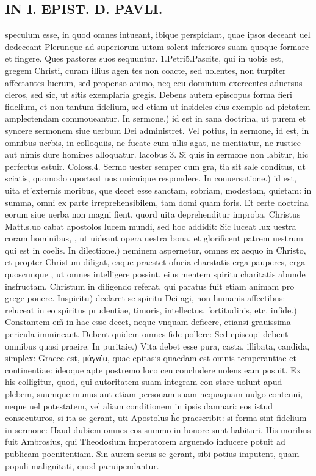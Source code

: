 \documentclass{article}
\begin{document}
\begin{pages}
\section*{IN I. EPIST. D. PAVLI. }
\marginpar{[ p.101 ]}\pstart speculum esse, in quod omnes intueant, ibique perspiciant, quae ipsos deceant uel dedeceant Plerunque ad superiorum uitam solent inferiores suam quoque formare et fingere. Ques pastores suos sequuntur. 1.Petri5.Pascite, qui in uobis est, gregem Christi, curam illius agen tes non coacte, sed uolentes, non turpiter affectantes lucrum, sed propenso animo, neq ceu dominium exercentes aduersus cleros, sed sic, ut sitis exemplaria gregis. Debens autem episcopus forma fieri fidelium, et non tantum fidelium, sed etiam ut insideles eius exemplo ad pietatem amplectendam commoueantur.  \pend\pstart In sermone.) id est in sana doctrina, ut purem et syncere sermonem siue uerbum Dei administret. Vel potius, in sermone, id est, in omnibus uerbis, in colloquiis, ne fucate cum ullis agat, ne mentiatur, ne rustice aut nimis dure homines alloquatur. lacobus 3. Si quis in sermone non labitur, hic perfectus estuir. Coloss.4. Sermo uester semper cum gra, tia sit sale conditus, ut sciatis, quomodo oporteat uos unicuique respondere.  \pend\pstart In conuersatione.) id est, uita et’externis moribus, que decet esse sanctam, sobriam, modestam, quietam: in summa, omni ex parte irreprehensibilem, tam domi quam foris. Et certe doctrina eorum siue uerba non magni fient, quord uita deprehenditur improba. Christus Matt.s.uo cabat apostolos lucem mundi, sed hoc addidit: Sic luceat lux uestra coram hominibus,  , ut uideant opera uestra bona, et glorificent patrem uestrum qui est in coelis.  \pend\pstart In dilectione.) neminem aspernetur, omnes ex aequo in Christo, et propter Christum diligat, eaque praestet ofneia charstatis erga pauperes, erga quoscunque , ut omnes intelligere possint, eius mentem spiritu charitatis abunde insfructam. Christum in diligendo referat, qui paratus fuit etiam animam pro grege ponere.  \pend\pstart Inspiritu) declaret se spiritu Dei agi, non humanis affectibus: reluceat in eo spiritus prudentiae, timoris, intellectus, fortitudinis, etc.  \pend\pstart infide.) Constantem em̃ in hac esse decet, neque vnquam deficere, etiansi grauissima pericula immineant. Debent quidem omnes fide pollere: Sed episcopi debent omnibus quasi praeire. In puritaie.) Vita debet esse pura, casta, illibata, candida, simplex: Graece est, μάγνέα, quae epitasis quaedam est omnis temperantiae et continentiae: ideoque apte postremo loco ceu concludere uolens eam posuit. Ex his colligitur, quod, qui autoritatem suam integram con stare uolunt apud plebem, suumque munus aut etiam personam suam nequaquam uulgo contenni, neque uel potestatem, vel aliam conditionem in ipsis damnari: eos istud consecuturos, si ita se gerant, uti Apostolus ĥe praescribit: si forma sint fidelium in sermone: Haud dubiem omnes eos summo in honore sunt habituri. His moribus fuit Ambrosius, qui Theodosium imperatorem arguendo inducere potuit ad publicam poenitentiam. Sin aurem secus se gerant, sibi potius imputent, quam populi malignitati, quod paruipendantur.  \pend
{}
{}

\end{pages}
\end{document}
